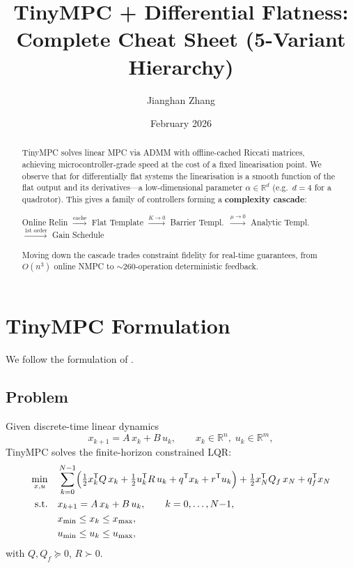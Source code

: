 \documentclass[11pt]{article}
\title{\textbf{TinyMPC + Differential Flatness}:\\
Complete Cheat Sheet (5-Variant Hierarchy)}
\author{Jianghan Zhang}
\date{February 2026}
\newcommand{\R}{\mathbb{R}}
\newcommand{\trans}{\mathsf{T}}
\begin{document}
\maketitle

\begin{abstract}
TinyMPC solves linear MPC via ADMM with offline-cached
Riccati matrices, achieving microcontroller-grade speed
at the cost of a fixed linearisation point.
We observe that for differentially flat systems
the linearisation is a smooth function of
the flat output and its derivatives---a
low-dimensional parameter $\alpha\in\R^d$
(e.g.\ $d=4$ for a quadrotor).
This gives a family of controllers forming a
\textbf{complexity cascade}:
\begin{center}
\small
Online Relin $\xrightarrow{\text{cache}}$
Flat Template $\xrightarrow{K\to 0}$
Barrier Templ.\ $\xrightarrow{\mu\to 0}$
Analytic Templ.\ $\xrightarrow{\text{1st order}}$
Gain Schedule
\end{center}
Moving down the cascade trades constraint fidelity
for real-time guarantees, from $O(n^3)$ online NMPC
to ${\sim}260$-operation deterministic feedback.
\end{abstract}

\tableofcontents
\newpage

\section{TinyMPC Formulation}\label{sec:tinympc}

We follow the formulation of \cite{tinympc}.

\subsection{Problem}

Given discrete-time linear dynamics
\begin{equation}\label{eq:dynamics}
  x_{k+1} = A\,x_k + B\,u_k,
  \qquad x_k \in \R^n,\; u_k \in \R^m,
\end{equation}
TinyMPC solves the finite-horizon constrained LQR:
\begin{equation}\label{eq:mpc}
\begin{aligned}
  \min_{x,u} \quad
    & \sum_{k=0}^{N-1}
      \Bigl(\tfrac{1}{2}x_k^\trans Q\, x_k
      + \tfrac{1}{2}u_k^\trans R\, u_k
      + q^\trans x_k + r^\trans u_k\Bigr)
      + \tfrac{1}{2}x_N^\trans Q_f\, x_N
      + q_f^\trans x_N \\
  \text{s.t.} \quad
    & x_{k+1} = A\,x_k + B\,u_k,
      \qquad k = 0,\ldots,N{-}1, \\
    & x_{\min} \le x_k \le x_{\max}, \\
    & u_{\min} \le u_k \le u_{\max},
\end{aligned}
\end{equation}
with $Q, Q_f \succeq 0$, $R \succ 0$.
\end{document}

